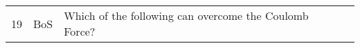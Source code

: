 \documentclass[10pt]{article}
\begin{document}
\begin{tiny}
\begin{longtable}{|r|p{0.375in}|p{1.275in}|p{3.5in}|}
19 &          BoS &                                                                                                                                                                                                                           Which of the following can overcome the Coulomb Force? &                                                                                                                                                                                                                                                                                                                                                                                                                                                                                                                                                                                                                                                                                                                                                                                                                                                                                                                                                                                                                                                                                                                                                                                                                                                                                                                                                                                                                                                                                                                                                                                                                                                                                                                                                                                                                                                                                                                                                                                                                                                                                                                                                                                                                                                                                                                                                                                                                                                                                                                                                                                                                                                                                                                                                                                                                                                                                                                                                                                                                                                                                               
\end{longtable}
\end{tiny}
\end{document}
